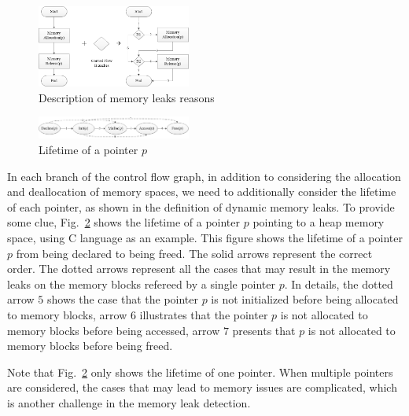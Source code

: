 \begin{figure}[!h]
\center
\includegraphics[width=0.45\textwidth]{figure/fig1-fig4/fig1}
\caption{Description of memory leaks reasons}
\label{fig:1}
\end{figure}

\begin{figure}[!h]
\center
\includegraphics[width=0.45\textwidth]{figure/fig1-fig4/fig2}
\caption{Lifetime of a pointer $p$}
\label{fig:2}
\end{figure}

In each branch of the control flow graph, in addition to considering the allocation and deallocation of memory spaces, we need to additionally consider the lifetime of each pointer, as shown in the definition of dynamic memory leaks. To provide some clue, Fig.~\ref{fig:2} shows the lifetime of a pointer $p$ pointing to a heap memory space, using C language as an example. This figure shows the lifetime of a pointer $p$ from being declared to being freed. The solid arrows represent the correct order. The dotted arrows represent all the cases that may result in the memory leaks on the memory blocks refereed by a single pointer $p$. In details, the dotted arrow $5$ shows the case that the pointer $p$ is not initialized before being allocated to memory blocks, arrow $6$ illustrates that the pointer $p$ is not allocated to memory blocks before being accessed, arrow $7$ presents that $p$ is not allocated to memory blocks before being freed.

Note that Fig.~\ref{fig:2} only shows the lifetime of one pointer. When multiple pointers are considered, the cases that may lead to memory issues are complicated, which is another challenge in the memory leak detection.

